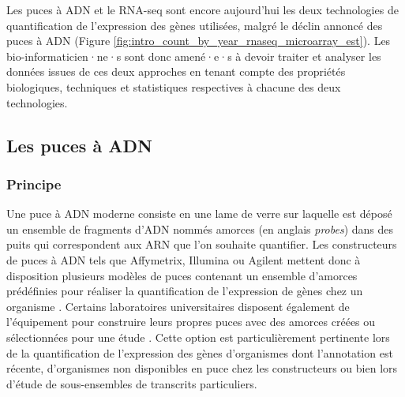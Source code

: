 Les puces à ADN et le RNA-seq sont encore aujourd'hui les deux technologies de quantification de l'expression des gènes utilisées, malgré le déclin annoncé des puces à ADN (Figure \ref{fig:intro_count_by_year_rnaseq_microarray_est}). Les bio-informaticien·ne·s sont donc amené·e·s à devoir traiter et analyser les données issues de ces deux approches en tenant compte des propriétés biologiques, techniques et statistiques respectives à chacune des deux technologies.




\subsection{Les puces à ADN}

\subsubsection{Principe}


Une puce à ADN moderne consiste en une lame de verre sur laquelle est déposé un ensemble de fragments d'ADN nommés amorces (en anglais \textit{probes}) dans des puits qui correspondent aux ARN que l'on souhaite quantifier. Les constructeurs de puces à ADN tels que Affymetrix, Illumina ou Agilent mettent donc à disposition plusieurs modèles de puces contenant un ensemble d'amorces prédéfinies pour réaliser la quantification de l'expression de gènes chez un organisme \cite{Liu2010}. Certains laboratoires universitaires disposent également de l'équipement pour construire leurs propres puces avec des amorces créées ou sélectionnées pour une étude \cite{Thompson2001Apr}. Cette option est particulièrement pertinente lors de la quantification de l'expression des gènes d'organismes dont l'annotation est récente, d'organismes non disponibles en puce chez les constructeurs ou bien lors d'étude de sous-ensembles de transcrits particuliers.


